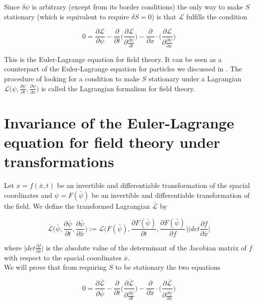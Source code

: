 \documentclass{article}
\begin{document}
Since $\delta \psi$ is arbitrary (except from its border conditions) the only way to make $S$ stationary (which is equivalent to require $\delta S = 0$) is that $\mathcal{L}$ fulfills the condition


\begin{equation}
0 = \frac{\partial \mathcal{L}}{\partial \psi}
-\frac{\partial}{\partial t} \bigg( \frac{\partial \mathcal{L}}{\partial \frac{\partial \psi}{\partial t}} \bigg) 
-\frac{\partial}{\partial x} \cdot \bigg( \frac{\partial \mathcal{L}}{\partial \frac{\partial \psi}{\partial x}} \bigg) 
\end{equation}

This is the Euler-Lagrange equation for field theory. It can be seen as a counterpart of the Euler-Lagrange equation for particles we discussed in \cite{WagnerGuthrie}. The procedure of looking for a condition to make $S$ stationary under a Lagrangian $\mathcal{L}\bigg(\psi, \frac{\partial \psi}{\partial t}, \frac{\partial \psi}{\partial x}\bigg)$ is called the Lagrangian formalism for field theory.

\section{Invariance of the Euler-Lagrange equation for field theory under transformations}

Let $x=f(\bar{x},t)$ be an invertible and differentiable transformation of the spacial coordinates and $\psi=F(\bar{\psi})$ be an invertible and differentiable transformation of the field. We define the transformed Lagrangian  $\bar{\mathcal{L}}$ by

\begin{equation} \label{LagrTransform}
\bar{\mathcal{L}}\bigg(\bar{\psi}, \frac{\partial \bar{\psi}}{\partial t}, \frac{\partial \bar{\psi}}{\partial \bar{x}}\bigg) 
:= \mathcal{L}\bigg(F(\bar{\psi}), \frac{\partial F(\bar{\psi})}{\partial t}, \frac{\partial F(\bar{\psi})}{\partial f}\bigg) 
\bigg| det \frac{\partial f}{\partial \bar{x}} \bigg|
\end{equation}

where $\bigg| det \frac{\partial f}{\partial \bar{x}} \bigg|$ is the absolute value of the determinant of the Jacobian matrix of $f$ with respect to the spacial coordinates $\bar{x}$. \\

We will prove that from requiring $S$ to be stationary the two equations

\begin{equation} \label{ELGTransformed}
0 = \frac{\partial \bar{\mathcal{L}}}{\partial \bar{\psi}}
-\frac{\partial}{\partial t} \bigg( \frac{\partial \mathcal{\bar{L}}}{\partial \frac{\partial \bar{\psi}}{\partial t}} \bigg) 
-\frac{\partial}{\partial \bar{x}} \cdot \bigg( \frac{\partial \mathcal{\bar{L}}}{\partial \frac{\partial \bar{\psi}}{\partial \bar{x}}} \bigg) 
\end{equation}
\end{document}
